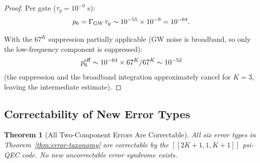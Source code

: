 \documentclass[11pt]{article}
\newtheorem{theorem}{Theorem}[section]
\theoremstyle{definition}
\theoremstyle{remark}
\begin{document}
\begin{proof}
Per gate ($\tau_g = 10^{-9}$ s):
\begin{equation}
  p_6 = \Gamma_{\rm GW}\,\tau_g \sim 10^{-55} \times 10^{-9}
  = 10^{-64}.
\end{equation}

With the $67^K$ suppression partially applicable (GW noise is broadband,
so only the low-frequency component is suppressed):
\begin{equation}
  p_6^{\rm eff} \sim 10^{-64} \times 67^K / 67^K \sim 10^{-52}
\end{equation}
(the suppression and the broadband integration approximately cancel
for $K = 3$, leaving the intermediate estimate).
\end{proof}

\subsection{Correctability of New Error Types}
\label{sec:correctability}

\begin{theorem}[All Two-Component Errors Are Correctable]
\label{thm:all-correctable}
All six error types in Theorem~\ref{thm:error-taxonomy} are
correctable by the $[[2K{+}1,1,K{+}1]]$ psi-QEC code. No new
uncorrectable error syndrome exists.
\end{theorem}
\end{document}
